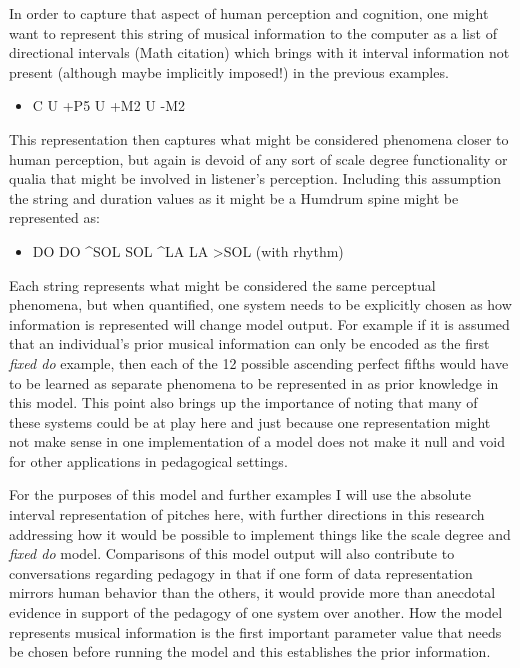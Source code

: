 \documentclass[]{book}
\providecommand{\tightlist}{%
  \setlength{\itemsep}{0pt}\setlength{\parskip}{0pt}}
\theoremstyle{definition}
\theoremstyle{definition}
\theoremstyle{definition}
\theoremstyle{remark}
\begin{document}
In order to capture that aspect of human perception and cognition, one
might want to represent this string of musical information to the
computer as a list of directional intervals (Math citation) which brings
with it interval information not present (although maybe implicitly
imposed!) in the previous examples.

\begin{itemize}
\tightlist
\item
  C U +P5 U +M2 U -M2
\end{itemize}

This representation then captures what might be considered phenomena
closer to human perception, but again is devoid of any sort of scale
degree functionality or qualia that might be involved in listener's
perception. Including this assumption the string and duration values as
it might be a Humdrum spine might be represented as:

\begin{itemize}
\tightlist
\item
  DO DO \^{}SOL SOL \^{}LA LA \textgreater{}SOL (with rhythm)
\end{itemize}

Each string represents what might be considered the same perceptual
phenomena, but when quantified, one system needs to be explicitly chosen
as how information is represented will change model output. For example
if it is assumed that an individual's prior musical information can only
be encoded as the first \emph{fixed do} example, then each of the 12
possible ascending perfect fifths would have to be learned as separate
phenomena to be represented in as prior knowledge in this model. This
point also brings up the importance of noting that many of these systems
could be at play here and just because one representation might not make
sense in one implementation of a model does not make it null and void
for other applications in pedagogical settings.

For the purposes of this model and further examples I will use the
absolute interval representation of pitches here, with further
directions in this research addressing how it would be possible to
implement things like the scale degree and \emph{fixed do} model.
Comparisons of this model output will also contribute to conversations
regarding pedagogy in that if one form of data representation mirrors
human behavior than the others, it would provide more than anecdotal
evidence in support of the pedagogy of one system over another. How the
model represents musical information is the first important parameter
value that needs be chosen before running the model and this establishes
the prior information.
\end{document}
